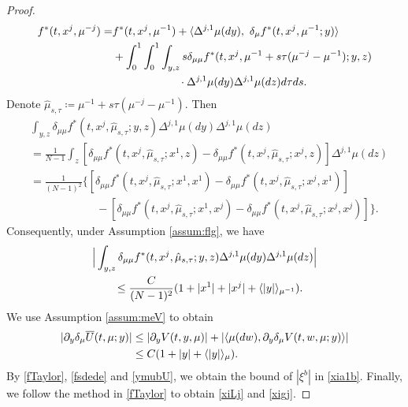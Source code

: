 \documentclass[10pt,a4paper]{amsart}
\begin{document}
\begin{proof}
\begin{align}
f^*(t, x^j, \mu^{-j})=& f^*(t, x^j, \mu^{-1}) +
\langle \Delta^{j,1} \mu(dy)  , \ \delta_\mu f^*(t, x^j, \mu^{-1} ; y)     \rangle \label{fTaylor} \\
& + \int_0^1\int_0^1\int_{y,z} s \delta_{\mu\mu} f^*(t,x^j, \mu^{-1}+ s\tau (\mu^{-j}-\mu^{-1}); y,z) \notag \\
&\qquad\qquad \qquad \cdot  \Delta^{j,1} \mu (dy)
 \Delta^{j,1} \mu  (dz)d\tau  ds.\notag
\end{align}
Denote $\hat\mu_{s,\tau}\coloneqq \mu^{-1}+ s\tau (\mu^{-j}-\mu^{-1}) $. Then
\begin{align*}
&\int_{y,z}\delta_{\mu\mu} f^*(t,x^j,\hat \mu_{s,\tau};y,z)\Delta^{j,1}\mu (dy)\Delta^{j,1}\mu (dz) \\
&=  \frac{1}{N-1} \int_z [\delta_{\mu\mu} f^*(t,x^j,\hat \mu_{s,\tau};x^1,z)- \delta_{\mu\mu} f^*(t,x^j,\hat \mu_{s,\tau};x^j,z) ]\Delta^{j,1}\mu (dz)\\
&=\frac{1}{(N-1)^2}\Big\{ [\delta_{\mu\mu} f^*(t,x^j,\hat \mu_{s,\tau};x^1,x^1)- \delta_{\mu\mu} f^*(t,x^j,\hat \mu_{s,\tau};x^j,x^1) ]\\
&\qquad\qquad\qquad- [\delta_{\mu\mu} f^*(t,x^j,\hat \mu_{s,\tau};x^1,x^j)- \delta_{\mu\mu} f^*(t,x^j,\hat \mu_{s,\tau};x^j,x^j) ]\Big\}.
\end{align*}
Consequently, under Assumption \ref{assum:flg}, we have
\begin{align}
&\Big|\int_{y,z}\delta_{\mu\mu} f^*(t,x^j,\hat \mu_{s,\tau};y,z)\Delta^{j,1}\mu (dy)\Delta^{j,1}\mu (dz)\Big| \label{fsdede}  \\
&\qquad \le \frac{C}{(N-1)^2} (1+|x^1|+|x^j| + \langle|y|\rangle_{\mu^{-1}} ).\notag
\end{align}
We  use Assumption \ref{assum:meV} to obtain
\begin{align}
|\partial_y \delta_\mu \overline U(t, \mu; y)|&\le
|\partial_y V(t, y,\mu)|+
|\langle \mu(dw), \partial_y\delta_\mu V(t, w, \mu; y)  \rangle | \label{ymubU}  \\
&\le C(1+ |y|+\langle |y|\rangle_\mu).\notag
\end{align}
By \eqref{fTaylor}, \eqref{fsdede} and \eqref{ymubU}, we obtain the bound of $|\xi^b|$ in \eqref{xia1b}.
Finally, we follow the method in \eqref{fTaylor} to obtain \eqref{xiLj} and \eqref{xigj}.
\end{proof}
\end{document}

